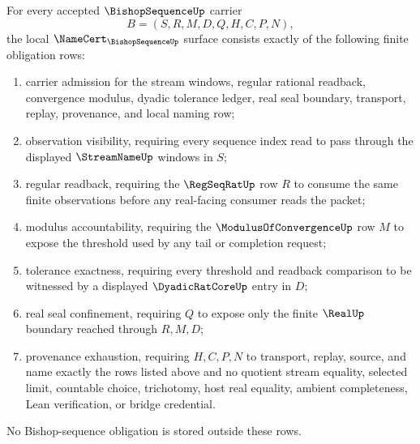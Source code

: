 \begin{theorem}
\label{thm:bishop-sequence-namecert-obligations}
For every accepted $\BishopSequenceUp$ carrier
$$
B=(S,R,M,D,Q,H,C,P,N),
$$
the local $\NameCert_{\BishopSequenceUp}$ surface consists exactly of the following finite obligation rows:
\begin{enumerate}
\item carrier admission for the stream windows, regular rational readback, convergence modulus, dyadic tolerance ledger, real seal boundary, transport, replay, provenance, and local naming row;
\item observation visibility, requiring every sequence index read to pass through the displayed $\StreamNameUp$ windows in $S$;
\item regular readback, requiring the $\RegSeqRatUp$ row $R$ to consume the same finite observations before any real-facing consumer reads the packet;
\item modulus accountability, requiring the $\ModulusOfConvergenceUp$ row $M$ to expose the threshold used by any tail or completion request;
\item tolerance exactness, requiring every threshold and readback comparison to be witnessed by a displayed $\DyadicRatCoreUp$ entry in $D$;
\item real seal confinement, requiring $Q$ to expose only the finite $\RealUp$ boundary reached through $R,M,D$;
\item provenance exhaustion, requiring $H,C,P,N$ to transport, replay, source, and name exactly the rows listed above and no quotient stream equality, selected limit, countable choice, trichotomy, host real equality, ambient completeness, Lean verification, or bridge credential.
\end{enumerate}
No Bishop-sequence obligation is stored outside these rows.
\end{theorem}


